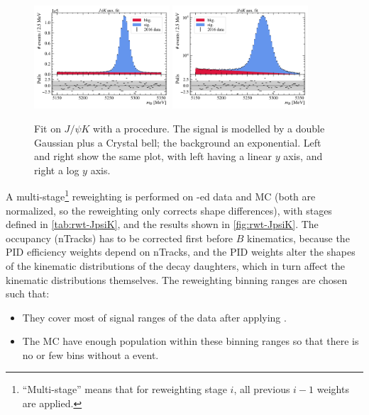\begin{figure}[htb]
    \centering
    \includegraphics[width=0.45\textwidth]{./figs-mc-correction/reweighting-JpsiK/fit-JpsiK/fit_final.pdf}
    \hspace{1em}
    \includegraphics[width=0.45\textwidth]{./figs-mc-correction/reweighting-JpsiK/fit-JpsiK/fit_final_log_scale.pdf}

    \caption{
        Fit on $J/\psi K$ with a \sPlot procedure.
        The signal is modelled by a double Gaussian plus a Crystal bell;
        the background an exponential.
        Left and right show the same plot, with left having a linear $y$ axis,
        and right a log $y$ axis.
    }
    \label{fig:fit-JpsiK-data}
\end{figure}

A multi-stage\footnote{
    ``Multi-stage'' means that for reweighting stage $i$,
    all previous $i-1$ weights are applied.
} reweighting is performed on \sWeight-ed data and MC
(both are normalized, so the reweighting only corrects shape differences),
with stages defined in \cref{tab:rwt-JpsiK},
and the results shown in \cref{fig:rwt-JpsiK}.
The occupancy (nTracks) has to be corrected first before $B$ kinematics,
because the PID efficiency weights depend on nTracks, and the PID weights alter
the shapes of the kinematic distributions of the \B decay daughters, which in
turn affect the \B kinematic distributions themselves.
The reweighting binning ranges are chosen such that:
\begin{itemize}
    \item They cover most of signal ranges of the data after applying \sWeight.
    \item The MC have enough population within these binning
        ranges so that there is no or few bins without a event.
\end{itemize}

